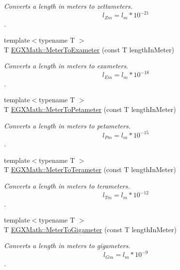 \begin{DoxyCompactItemize}
\begin{DoxyCompactList}\small\item\em Converts a length in meters to zettameters. \[ l_{Zm}=l_{m} * 10^{-21} \]. \end{DoxyCompactList}\item 
{\footnotesize template$<$typename T $>$ }\\T \mbox{\hyperlink{group___e_g_x_math-_conversions-_length_conversions-_s_i-_meter-_s_i_gadee48ed1b24c416ef0289dc4d803504b}{E\+G\+X\+Math\+::\+Meter\+To\+Exameter}} (const T length\+In\+Meter)
\begin{DoxyCompactList}\small\item\em Converts a length in meters to exameters. \[ l_{Em}=l_{m} * 10^{-18} \]. \end{DoxyCompactList}\item 
{\footnotesize template$<$typename T $>$ }\\T \mbox{\hyperlink{group___e_g_x_math-_conversions-_length_conversions-_s_i-_meter-_s_i_gaf808f7191ee069df013a26281f227388}{E\+G\+X\+Math\+::\+Meter\+To\+Petameter}} (const T length\+In\+Meter)
\begin{DoxyCompactList}\small\item\em Converts a length in meters to petameters. \[ l_{Pm}=l_{m} * 10^{-15} \]. \end{DoxyCompactList}\item 
{\footnotesize template$<$typename T $>$ }\\T \mbox{\hyperlink{group___e_g_x_math-_conversions-_length_conversions-_s_i-_meter-_s_i_gac4c21d00b7d8e8fc1c9e354f77bf94b2}{E\+G\+X\+Math\+::\+Meter\+To\+Terameter}} (const T length\+In\+Meter)
\begin{DoxyCompactList}\small\item\em Converts a length in meters to terameters. \[ l_{Tm}=l_{m} * 10^{-12} \]. \end{DoxyCompactList}\item 
{\footnotesize template$<$typename T $>$ }\\T \mbox{\hyperlink{group___e_g_x_math-_conversions-_length_conversions-_s_i-_meter-_s_i_ga045300d4eccd668680eab86f9262cc81}{E\+G\+X\+Math\+::\+Meter\+To\+Gigameter}} (const T length\+In\+Meter)
\begin{DoxyCompactList}\small\item\em Converts a length in meters to gigameters. \[ l_{Gm}=l_{m} * 10^{-9} \]. \end{DoxyCompactList}\item 

\end{DoxyCompactItemize}
